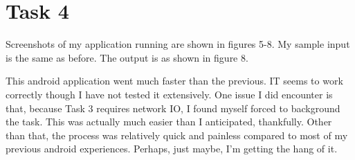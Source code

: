 \documentclass[11pt]{article}
\begin{document}
\section{Task 4}
Screenshots of my application running are shown in figures 5-8.  My sample input is the same as before. The output is as shown in figure 8. 

This android application went much faster than the previous. IT seems to work correctly though I have not tested it extensively. One issue I did encounter is that, because Task 3 requires network IO, I found myself forced to background the task. This was actually much easier than I anticipated, thankfully. Other than that, the process was relatively quick and painless compared to most of my previous android experiences. Perhaps, just maybe, I'm getting the hang of it.
\end{document}
